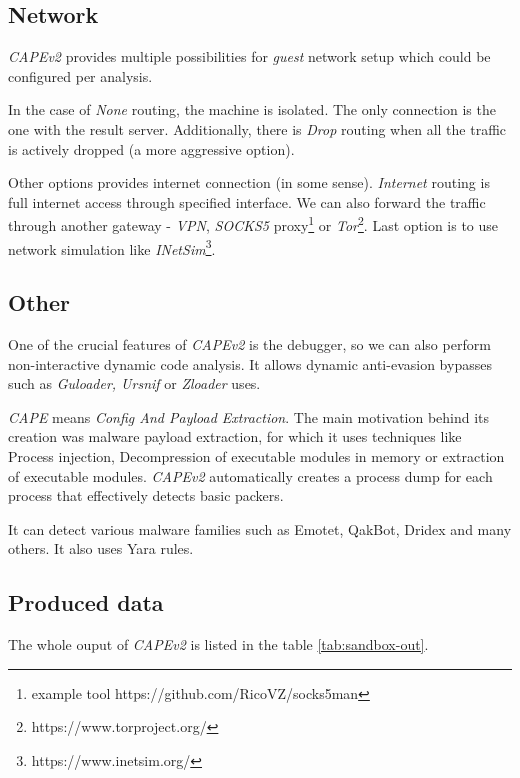 \subsection{Network}
\emph{CAPEv2} provides multiple possibilities for \emph{guest} network setup which could be configured per analysis. 

In the case of \emph{None} routing, the machine is isolated. The only connection is the one with the result server. Additionally, there is \emph{Drop} routing when all the traffic is actively dropped (a more aggressive option). 

Other options provides internet connection (in some sense). \emph{Internet} routing is full internet access through specified interface. We can also forward the traffic through another gateway - \emph{VPN}, \emph{SOCKS5} proxy\footnote{example tool https://github.com/RicoVZ/socks5man} or \emph{Tor}\footnote{https://www.torproject.org/}. Last option is to use network simulation like \emph{INetSim}\footnote{https://www.inetsim.org/}.

\subsection{Other}
One of the crucial features of \emph{CAPEv2} is the debugger, so we can also perform non-interactive dynamic code analysis. It allows dynamic anti-evasion bypasses such as \emph{Guloader, Ursnif} or \emph{Zloader} uses.

\emph{CAPE} means \emph{Config And Payload Extraction}. The main motivation behind its creation was malware payload extraction, for which it uses techniques like Process injection, Decompression of executable modules in memory or extraction of executable modules. \emph{CAPEv2} automatically creates a process dump for each process that effectively detects basic packers.

It can detect various malware families such as Emotet, QakBot, Dridex and many others. It also uses Yara rules.

\subsection{Produced data}
The whole ouput of \emph{CAPEv2} is listed in the table \ref{tab:sandbox-out}. 

